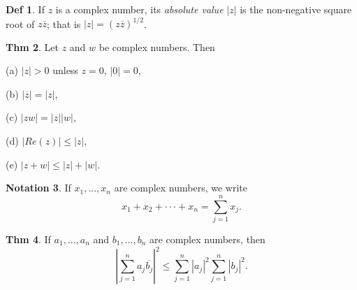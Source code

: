 \documentclass{article}
\theoremstyle{definition}
\newtheorem{definition}{Def}
\newtheorem{theorem}[definition]{Thm}
\newtheorem{notation}[definition]{Notation}
\begin{document}
\begin{definition}
    If $z$ is a complex number, its \textit{absolute value} $|z|$ is the non-negative square root of $z\overline{z}$; that is $|z|=(z\overline{z})^{1/2}$.
\end{definition}
\begin{theorem}
    Let $z$ and $w$ be complex numbers. Then\par
    (a) $|z|>0$ unless $z=0$, $|0|=0$,\par
    (b) $|\overline{z}|=|z|$,\par
    (c) $|zw|=|z||w|$,\par
    (d) $|Re(z)|\leq|z|$,\par
    (e) $|z+w|\leq|z|+|w|$.
\end{theorem}
\begin{notation}
    If $x_1,...,x_n$ are complex numbers, we write
    \[
    x_1+x_2+\cdot\cdot\cdot+x_n=\sum_{j=1}^n x_j.
    \]
\end{notation}
\begin{theorem}
    If $a_1,...,a_n$ and $b_1,...,b_n$ are complex numbers, then
    \[
    |\sum_{j=1}^n a_j\overline{b_j}|^2 \leq \sum_{j=1}^n |a_j|^2 \sum_{j=1}^n |b_j|^2.
    \]
\end{theorem}
\end{document}
